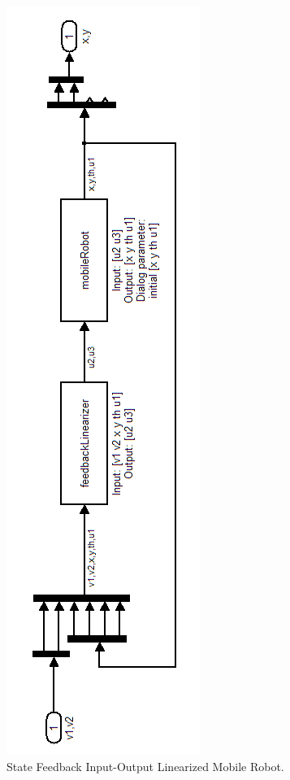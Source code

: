 \documentclass[11pt, a4paper, oneside, openany, reqno]{book}
\theoremstyle{definition}
\theoremstyle{remark}
\numberwithin{equation}{chapter} %
\begin{document}
\begin{figure}[htp]
	\centering
	\includegraphics[height=0.75\textheight]{feedbackLinearization.png}
	\caption{State Feedback Input-Output Linearized Mobile Robot.}
\end{figure}
\end{document}
